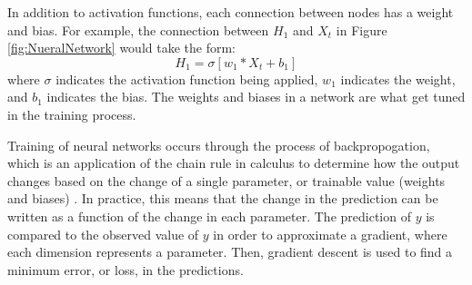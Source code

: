 In addition to activation functions, each connection between nodes has a weight and bias. For example, the connection between $H_1$ and $X_t$ in Figure \ref{fig:NueralNetwork} would take the form:
\begin{equation*}
    H_1 = \sigma[w_1*X_t + b_1]
\end{equation*}
where $\sigma$ indicates the activation function being applied, $w_1$ indicates the weight, and $b_1$ indicates the bias. The weights and biases in a network are what get tuned in the training process.

Training of neural networks occurs through the process of backpropogation, which is an application of the chain rule in calculus to determine how the output changes based on the change of a single parameter, or trainable value (weights and biases) \citep{rojas1996backpropagation}. In practice, this means that the change in the prediction can be written as a function of the change in each parameter. The prediction of $y$ is compared to the observed value of $y$ in order to approximate a gradient, where each dimension represents a parameter. Then, gradient descent is used to find a minimum error, or loss, in the predictions.
